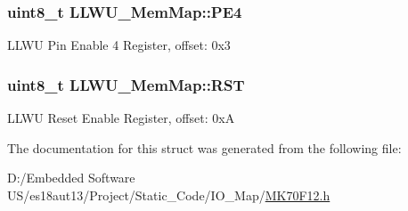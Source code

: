 \subsubsection[{P\+E4}]{\setlength{\rightskip}{0pt plus 5cm}uint8\+\_\+t L\+L\+W\+U\+\_\+\+Mem\+Map\+::\+P\+E4}\label{struct_l_l_w_u___mem_map_a61ec3534039e161c5c71ea7f290f23d5}
L\+L\+W\+U Pin Enable 4 Register, offset\+: 0x3 \hypertarget{struct_l_l_w_u___mem_map_a95c7e36f114e8ac7f235ad8ef335f1cf}{}
\subsubsection[{R\+S\+T}]{\setlength{\rightskip}{0pt plus 5cm}uint8\+\_\+t L\+L\+W\+U\+\_\+\+Mem\+Map\+::\+R\+S\+T}\label{struct_l_l_w_u___mem_map_a95c7e36f114e8ac7f235ad8ef335f1cf}
L\+L\+W\+U Reset Enable Register, offset\+: 0x\+A 

The documentation for this struct was generated from the following file\+:\begin{DoxyCompactItemize}
\item 
D\+:/\+Embedded Software U\+S/es18aut13/\+Project/\+Static\+\_\+\+Code/\+I\+O\+\_\+\+Map/\hyperlink{_m_k70_f12_8h}{M\+K70\+F12.\+h}\end{DoxyCompactItemize}
